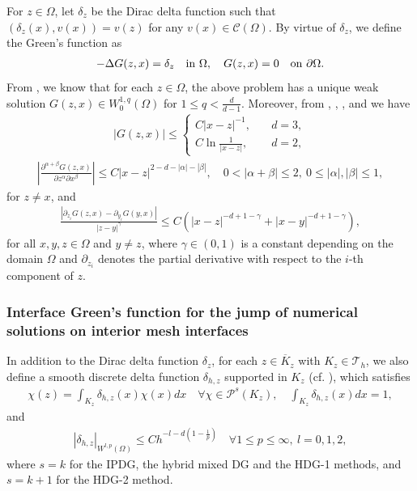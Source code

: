 \documentclass[1996/10/24]{amsart}
\theoremstyle{definition}
\numberwithin{equation}{section}
\begin{document}
For $z\in\Omega$, let $\delta_z$ be the Dirac delta function such that $(\delta_z(x), v(x))=v(z)$ for any $v(x)\in\mathcal{C}(\Omega)$. By virtue of $\delta_z$, we define the Green's function as
\begin{align}
-\Delta G(z,x)=\delta_z\quad {\rm in}~\Omega,\quad G(z,x)=0\quad {\rm on}~\partial\Omega.\label{G}
\end{align}
From \cite[Theorem 2]{c1985}, we know that for each $z\in\Omega$, the above problem has a unique weak solution $G(z,x)\in W_0^{1,q}(\Omega)$ for $1\leq q<\frac{d}{d-1}$. Moreover, from \cite[Theorem 5.1.1 and Theorem 5.1.8]{mr2010}, \cite[Lemma 3.2]{dlsw2012}, \cite[Theorem 1]{glrs2009}, and
\cite[Proposition 4.1]{drs2024} we have
\begin{align}\label{pe-G:0}
|G(z,x)|\leq \begin{cases}
C|x-z|^{-1},\quad &d=3,\\
C\ln\frac{1}{|x-z|},\quad &d=2,
\end{cases}
\end{align}
\begin{align}
\left|\frac{\partial^{\alpha+\beta}G(z,x)}{\partial z^{\alpha}\partial x^{\beta}}\right|\leq C|x-z|^{2-d-|\alpha|-|\beta|},\quad 0<|\alpha+\beta|\leq 2,~
0\leq |\alpha|,|\beta|\leq 1,\label{pe-G}
\end{align}
for $z\neq x$, and
\begin{align}
\frac{|\partial_{z_i}G(z,x)-\partial_{y_i}G(y,x)|}{|z-y|^{\gamma}}\leq C\left(|x-z|^{-d+1-\gamma}+|x-y|^{-d+1-\gamma}\right),\label{pe-G:1}
\end{align}
for all $x,y,z\in \Omega$ and $y\neq z$, where $\gamma\in(0,1)$ is a constant depending on the domain $\Omega$ and $\partial_{z_i}$ denotes the partial derivative with respect to the $i$-th component of $z$.

\subsubsection{Interface Green's function for the jump of numerical solutions on interior mesh interfaces}
\label{sec3:3.2}

In addition to the Dirac delta function $\delta_z$, for each $z\in \overline{K}_z$ with $K_z\in\mathcal{T}_h$, we also define a smooth discrete delta function $\delta_{h,z}$ supported in $K_z$ (cf. \cite[Appendix A]{sw1995}), which satisfies
\begin{align}
\chi(z)=\int_{K_z}\delta_{h,z}(x)\chi(x)dx\quad \forall \chi\in \mathcal{P}^s(K_z),\quad \int_{K_z}\delta_{h,z}(x)dx=1,\label{ddd:1}
\end{align}
and
\begin{align}
|\delta_{h,z}|_{W^{l,p}(\Omega)}\leq Ch^{-l-d\left(1-\frac{1}{p}\right)}\quad \forall 1\leq p\leq \infty,~l=0,1,2,\label{ddd:2}
\end{align}
where $s=k$ for the IPDG, the hybrid mixed DG and the HDG-1 methods, and $s=k+1$ for the HDG-2 method.
\end{document}
